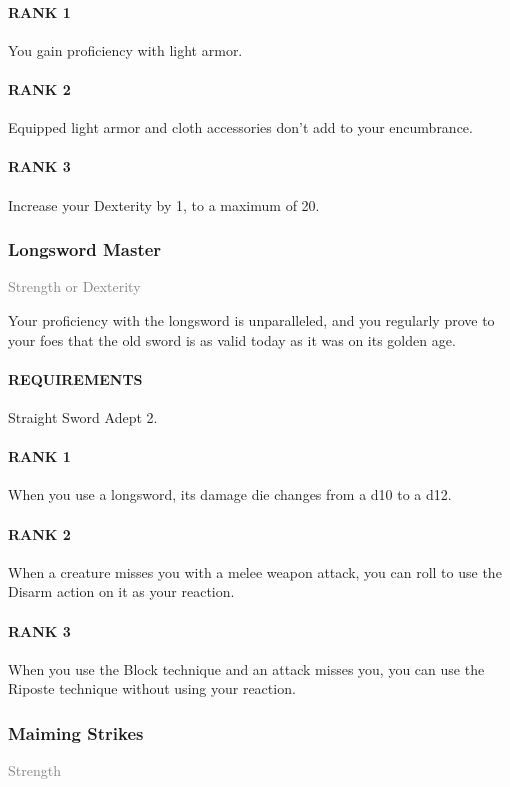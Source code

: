 \paragraph{RANK 1} You gain proficiency with light armor.
\paragraph{RANK 2} Equipped light armor and cloth accessories don't add to your encumbrance.
\paragraph{RANK 3} Increase your Dexterity by 1, to a maximum of 20.

\subsubsection{Longsword Master} \label{feat::longswordmaster}
\small{\textcolor{gray}{Strength or Dexterity}}

\normalsize
Your proficiency with the longsword is unparalleled, and you regularly prove to your foes that the old sword is as valid today as it was on its golden age.
\paragraph{REQUIREMENTS} Straight Sword Adept 2.
\paragraph{RANK 1} When you use a longsword, its damage die changes from a d10 to a d12.
\paragraph{RANK 2} When a creature misses you with a melee weapon attack, you can roll to use the Disarm action on it as your reaction.
\paragraph{RANK 3} When you use the Block technique and an attack misses you, you can use the Riposte technique without using your reaction.

\subsubsection{Maiming Strikes} \label{feat::maimingstrikes}
\small{\textcolor{gray}{Strength}}

